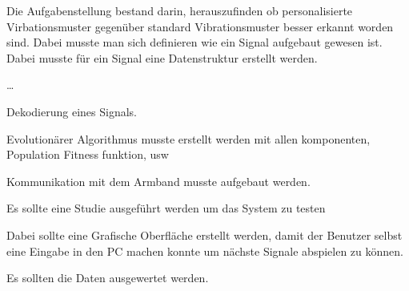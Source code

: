 
Die Aufgabenstellung bestand darin, herauszufinden ob personalisierte Virbationsmuster gegenüber standard Vibrationsmuster besser erkannt worden sind. 
Dabei musste man sich definieren wie ein Signal aufgebaut gewesen ist. Dabei musste für ein Signal eine Datenstruktur erstellt werden. 

\dots

Dekodierung eines Signals.

Evolutionärer Algorithmus musste erstellt werden mit allen komponenten, Population Fitness funktion, usw

Kommunikation mit dem Armband musste aufgebaut werden. 

Es sollte eine Studie ausgeführt werden um das System zu testen 

Dabei sollte eine Grafische Oberfläche erstellt werden, damit der Benutzer selbst eine Eingabe in den PC machen konnte um nächste Signale abspielen zu können.

Es sollten die Daten ausgewertet werden.
